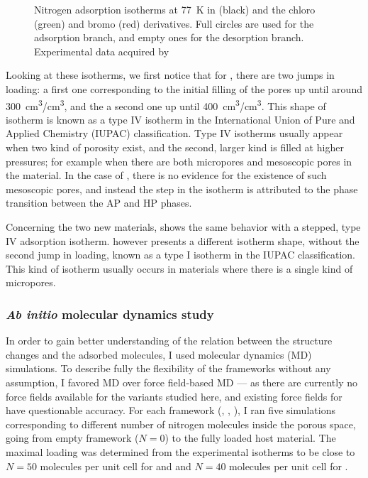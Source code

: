 \documentclass[thesis]{subfiles}
\begin{document}
\begin{figure}[ht]
    \centering
    
    \caption{Nitrogen adsorption isotherms at \SI{77}{K} in  (black) and
    the chloro (green) and bromo (red) derivatives. Full circles are used for
    the adsorption branch, and empty ones for the desorption branch.
    Experimental data acquired by\citeauthor{Chaplais2018}\cite{Chaplais2018}}
    \label{fig:zif8x:isotherms}
\end{figure}

Looking at these isotherms, we first notice that for , there are two jumps
in loading: a first one corresponding to the initial filling of the pores up
until around \SI{300}{cm^3/cm^3}, and the a second one up until
\SI{400}{cm^3/cm^3}. This shape of isotherm is known as a type IV isotherm in
the International Union of Pure and Applied Chemistry (IUPAC)
classification\cite{Sing1985}. Type IV isotherms usually appear when two kind of
porosity exist, and the second, larger kind is filled at higher pressures; for
example when there are both micropores and mesoscopic pores in the material. In
the case of , there is no evidence for the existence of such mesoscopic
pores, and instead the step in the isotherm is attributed to the phase
transition between the AP and HP phases.

Concerning the two new materials, \ZIFCl shows the same behavior with a stepped,
type IV adsorption isotherm. \ZIFBr however presents a different isotherm shape,
without the second jump in loading, known as a type I isotherm in the IUPAC
classification. This kind of isotherm usually occurs in materials where there is
a single kind of micropores.

\subsubsection{\emph{Ab initio} molecular dynamics study}
\label{sec:zif8x:methods}

In order to gain better understanding of the relation between the structure
changes and the adsorbed molecules, I used molecular dynamics (MD) simulations.
To describe fully the flexibility of the frameworks without any assumption, I
favored \abinitio MD over force field-based MD --- as there are currently no
force fields available for the  variants studied here, and existing force
fields for  have questionable accuracy. For each framework (,
\ZIFCl, \ZIFBr), I ran five simulations corresponding to different number of
nitrogen molecules inside the porous space, going from empty framework ($N = 0$)
to the fully loaded host material. The maximal loading was determined from the
experimental isotherms to be close to $N = 50$ molecules per unit cell for
 and \ZIFCl and $N = 40$ molecules per unit cell for \ZIFBr.
\end{document}
